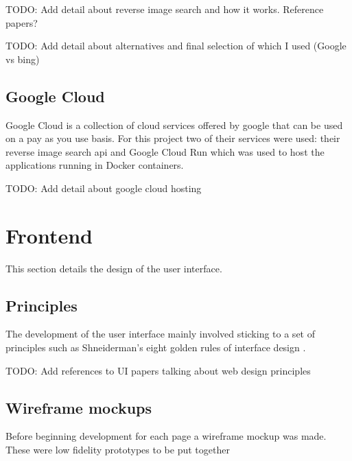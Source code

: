 TODO: Add detail about reverse image search and how it works. Reference papers?

TODO: Add detail about alternatives and final selection of which I used (Google vs bing)

\subsection{Google Cloud}
Google Cloud is a collection of cloud services offered by google that can be used on a pay as you use basis. For this project two of their services were used: their reverse image search api and Google Cloud Run which was used to host the applications running in Docker containers.

TODO: Add detail about google cloud hosting















\section{Frontend}
This section details the design of the user interface.
\subsection{Principles}
The development of the user interface mainly involved sticking to a set of principles such as Shneiderman's eight golden rules of interface design \cite{Shneiderman}.

TODO: Add references to UI papers talking about web design principles
\subsection{Wireframe mockups}
Before beginning development for each page a wireframe mockup was made. These were low fidelity prototypes to be put together

